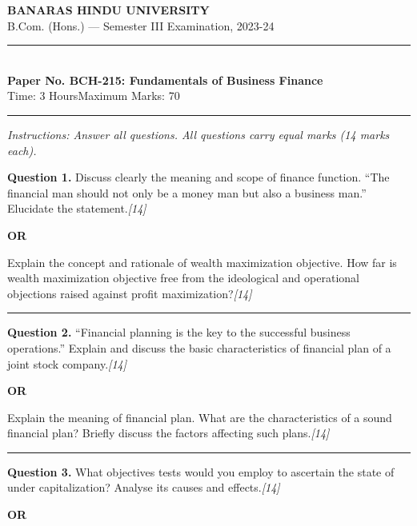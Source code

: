 \documentclass[11pt,a4paper]{article}
\newcommand{\pts}[1]{\hfill   \textit{[#1]}}
\begin{document}
\begin{center}
  {\large\bfseries BANARAS HINDU UNIVERSITY}\\[2pt]
  {\normalsize B.Com. (Hons.) --- Semester III Examination, 2023-24}\\[6pt]
  \rule{0.8\linewidth}{0.5pt}\\[6pt]
  {\large\bfseries Paper No. BCH-215: Fundamentals of Business Finance}\\[4pt]
  {\normalsize Time: 3 Hours\hfill Maximum Marks: 70}
\end{center}

\rule{\linewidth}{0.4pt}

\smallskip



\noindent   \textit{Instructions: Answer all questions. All questions carry equal marks (14 marks each).}

\bigskip




\noindent   \textbf{Question 1.}
Discuss clearly the meaning and scope of finance function. ``The financial man should not only be a money man but also a business man.'' Elucidate the statement.\pts{14}

\centerline{   \textbf{OR}}

Explain the concept and rationale of wealth maximization objective. How far is wealth maximization objective free from the ideological and operational objections raised against profit maximization?\pts{14}

\medskip\rule{\linewidth}{0.2pt}




\noindent   \textbf{Question 2.}
``Financial planning is the key to the successful business operations.'' Explain and discuss the basic characteristics of financial plan of a joint stock company.\pts{14}

\centerline{   \textbf{OR}}

Explain the meaning of financial plan. What are the characteristics of a sound financial plan? Briefly discuss the factors affecting such plans.\pts{14}

\medskip\rule{\linewidth}{0.2pt}




\noindent   \textbf{Question 3.}
What objectives tests would you employ to ascertain the state of under capitalization? Analyse its causes and effects.\pts{14}

\centerline{   \textbf{OR}}
\end{document}
